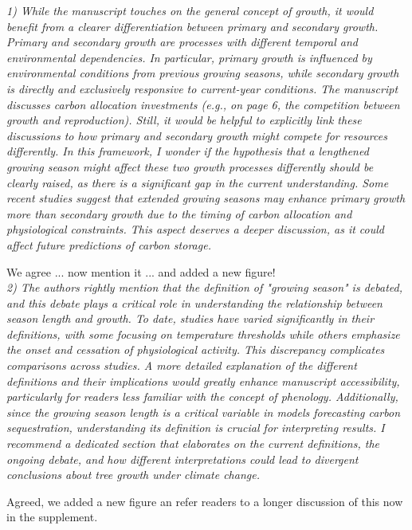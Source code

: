 \documentclass[11pt]{article}
\begin{document}
\emph{1) While the manuscript touches on the general concept of growth, it would benefit from a clearer differentiation between primary and secondary growth. Primary and secondary growth are processes with different temporal and environmental dependencies. In particular, primary growth is influenced by environmental conditions from previous growing seasons, while secondary growth is directly and exclusively responsive to current-year conditions. The manuscript discusses carbon allocation investments (e.g., on page 6, the competition between growth and reproduction). Still, it would be helpful to explicitly link these discussions to how primary and secondary growth might compete for resources differently. In this framework, I wonder if the hypothesis that a lengthened growing season might affect these two growth processes differently should be clearly raised, as there is a significant gap in the current understanding. Some recent studies suggest that extended growing seasons may enhance primary growth more than secondary growth due to the timing of carbon allocation and physiological constraints. This aspect deserves a deeper discussion, as it could affect future predictions of carbon storage.}

We agree ... now mention it ... and added a new figure!\\


\emph{2) The authors rightly mention that the definition of "growing season" is debated, and this debate plays a critical role in understanding the relationship between season length and growth. To date, studies have varied significantly in their definitions, with some focusing on temperature thresholds while others emphasize the onset and cessation of physiological activity. This discrepancy complicates comparisons across studies. A more detailed explanation of the different definitions and their implications would greatly enhance manuscript accessibility, particularly for readers less familiar with the concept of phenology. Additionally, since the growing season length is a critical variable in models forecasting carbon sequestration, understanding its definition is crucial for interpreting results. I recommend a dedicated section that elaborates on the current definitions, the ongoing debate, and how different interpretations could lead to divergent conclusions about tree growth under climate change.}

Agreed, we added a new figure an refer readers to a longer discussion of this now in the supplement.\\
\end{document}
